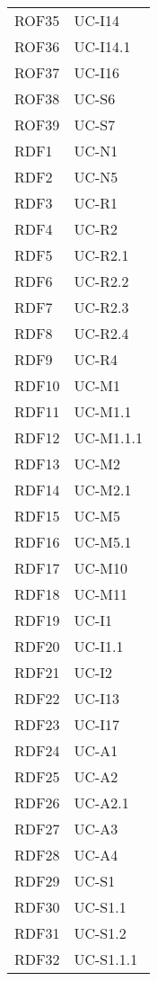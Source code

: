 \begin{longtable}{| p{5cm} | p{5cm} |}
		\rowcolor{LightGray}
		ROF35 & UC-I14\\
		ROF36 & UC-I14.1\\
		\rowcolor{LightGray}
		ROF37 & UC-I16\\
		ROF38 & UC-S6\\
		\rowcolor{LightGray}
		ROF39 & UC-S7\\		
		RDF1 & UC-N1\\
		\rowcolor{LightGray}
		RDF2 & UC-N5\\
		RDF3 & UC-R1 \\
		\rowcolor{LightGray}
		RDF4 & UC-R2\\
		RDF5 & UC-R2.1\\
		\rowcolor{LightGray}
		RDF6 & UC-R2.2\\
		RDF7 & UC-R2.3\\
		\rowcolor{LightGray}
		RDF8 & UC-R2.4\\
		RDF9 & UC-R4\\
		\rowcolor{LightGray}
		RDF10 & UC-M1\\
		RDF11 & UC-M1.1 \\
		\rowcolor{LightGray}
		RDF12 & UC-M1.1.1 \\
		\rowcolor{LightGray}
		RDF13 & UC-M2 \\
		RDF14 & UC-M2.1 \\
		\rowcolor{LightGray}
		RDF15 & UC-M5 \\
		RDF16 & UC-M5.1 \\
		\rowcolor{LightGray}	
		RDF17 & UC-M10\\
		RDF18 & UC-M11\\
		\rowcolor{LightGray}
		RDF19 & UC-I1\\
		RDF20 & UC-I1.1\\
		\rowcolor{LightGray}
		RDF21 & UC-I2 \\
		RDF22 & UC-I13 \\
		\rowcolor{LightGray}
		RDF23 & UC-I17\\
		RDF24 & UC-A1\\
		\rowcolor{LightGray}
		RDF25 & UC-A2\\
		RDF26 & UC-A2.1\\
		\rowcolor{LightGray}
		RDF27 & UC-A3\\
		RDF28 & UC-A4\\
		\rowcolor{LightGray}
		RDF29 & UC-S1\\
		RDF30 & UC-S1.1\\
		\rowcolor{LightGray}
		RDF31 & UC-S1.2\\
		RDF32 & UC-S1.1.1\\

\end{longtable}

